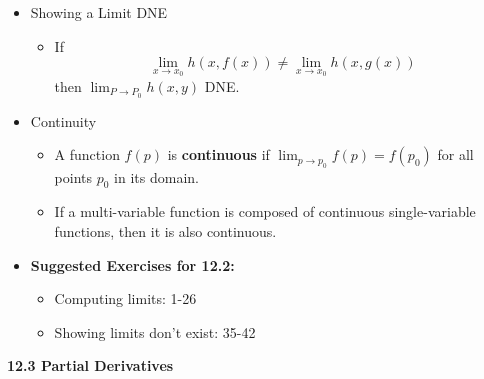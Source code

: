 \documentclass[12pt]{article}
\newcommand{\ds}{\displaystyle}
\newcommand{\<}{\left<}
\renewcommand{\>}{\right>}
\begin{document}
\begin{itemize}
  \item Showing a Limit DNE
  
    \begin{itemize}
      \item If
        \[
          \lim_{x\to x_0} h(x,f(x)) \not= \lim_{x\to x_0} h(x,g(x))
        \]
        then $\ds\lim_{P\to P_0} h(x,y)$ DNE.
    \end{itemize}
  
  \item Continuity
  
    \begin{itemize}
      \item A function $f(p)$ is \textbf{continuous} if $\ds \lim_{p\to p_0}f(p) = f(p_0)$ for all points $p_0$ in its domain.
      \item If a multi-variable function is composed of continuous single-variable functions, then it is also continuous.
    \end{itemize}
  
  \item \textbf{ Suggested Exercises for 12.2:}
  
    \begin{itemize}
    \item Computing limits: 1-26
    \item Showing limits don't exist: 35-42
    \end{itemize}

\end{itemize}

\newpage

\centerline{\bf 12.3 Partial Derivatives}
\end{document}
